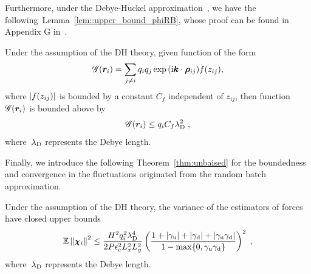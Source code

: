 Furthermore, under the Debye-H$\ddot{\text{u}}$ckel approximation~\cite{levin2002electrostatic}, we have  the following~Lemma~\ref{lem::upper_bound_phiRB}, whose proof can be found in Appendix G in~\cite{gan2024fast}.
\begin{lem} \label{lem::upper_bound_phiRB}
  Under the assumption of the DH theory, given function of the form 
    \begin{equation}
       \mathscr{G}(\boldsymbol{r}_i)=\sum_{j\neq i}q _i q_{j}\exp{(\mathrm{i} \boldsymbol{k} \cdot \boldsymbol{\rho}_{ij})}f(z_{ij}),
    \end{equation}
 where $\lvert f(z_{ij})\rvert$ is bounded by  a constant $C_f$ independent of $z_{ij}$, then function $ \mathscr{G}(\boldsymbol{r}_i)$ is bounded above by
    \begin{equation}
         \mathscr{G}(\boldsymbol{r}_i)\leq q_i  C_f\lambda_{\mathrm{D}}^2\;,
    \end{equation}
    where~$\lambda_{\mathrm{D}}$  represents the Debye length.
\end{lem}
Finally, we introduce the following Theorem~\ref{thm:unbaised} for the boundedness and convergence in the fluctuations originated from the random batch approximation.
\begin{thm}\label{thm:unbaised}
	Under the assumption of the DH theory,   the variance  of the estimators of   forces have closed upper bounds
	\begin{equation}
		  \mathbb{E}\left\lVert\boldsymbol{\chi}_{i}\right\rVert^2\leq\frac{ H^2q_i^2\lambda_{\mathrm{D}}^4}{2P\epsilon_{\mathrm{c}}^2 L_x^2L_y^2}\left( \frac{1+\left\lvert\gamma_{\mathrm{u}}\right\rvert+\left\lvert\gamma_{\mathrm{d}}\right\rvert+\left\lvert\gamma_{\mathrm{u}}\gamma_{\mathrm{d}}\right\rvert}{1-\max\{0,\gamma_{\mathrm{u}}\gamma_{\mathrm{d}}\}}\right)^2\;,
	\end{equation}
     where~$\lambda_{\mathrm{D}}$  represents the Debye length.
\end{thm}
